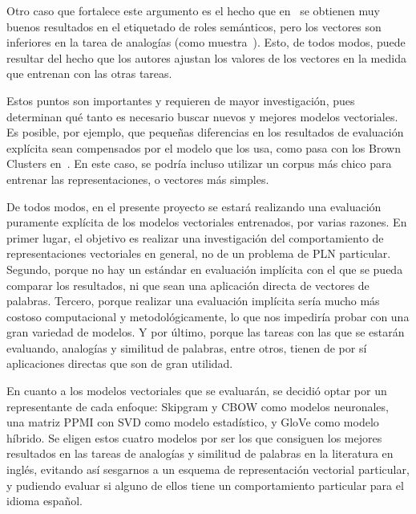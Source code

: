 Otro caso que fortalece este argumento es el hecho que en~\cite{CollobertWeston2008} se obtienen muy
buenos resultados en el etiquetado de roles semánticos, pero los vectores son inferiores en la tarea
de analogías (como muestra~\cite{Mikolov2013a}). Esto, de todos modos, puede resultar del hecho que
los autores ajustan los valores de los vectores en la medida que entrenan con las otras tareas.

Estos puntos son importantes y requieren de mayor investigación, pues determinan qué tanto es
necesario buscar nuevos y mejores modelos vectoriales. Es posible, por ejemplo, que pequeñas
diferencias en los resultados de evaluación explícita sean compensados por el modelo que los usa,
como pasa con los Brown Clusters en~\cite{Qu2015}. En este caso, se podría incluso utilizar un
corpus más chico para entrenar las representaciones, o vectores más simples.


De todos modos, en el presente proyecto se estará realizando una evaluación puramente explícita de
los modelos vectoriales entrenados, por varias razones. En primer lugar, el objetivo es realizar una
investigación del comportamiento de representaciones vectoriales en general, no de un problema de
PLN particular. Segundo, porque no hay un estándar en evaluación implícita con el que se pueda
comparar los resultados, ni que sean una aplicación directa de vectores de palabras. Tercero, porque
realizar una evaluación implícita sería mucho más costoso computacional y metodológicamente, lo que
nos impediría probar con una gran variedad de modelos. Y por último, porque las tareas con las que
se estarán evaluando, analogías y similitud de palabras, entre otros, tienen de por sí aplicaciones
directas que son de gran utilidad.


En cuanto a los modelos vectoriales que se evaluarán, se decidió optar por un representante de cada
enfoque: Skipgram y CBOW como modelos neuronales, una matriz PPMI con SVD como modelo estadístico, y
GloVe como modelo híbrido. Se eligen estos cuatro modelos por ser los que consiguen los mejores
resultados en las tareas de analogías y similitud de palabras en la literatura en inglés, evitando
así sesgarnos a un esquema de representación vectorial particular, y pudiendo evaluar si alguno de
ellos tiene un comportamiento particular para el idioma español.
